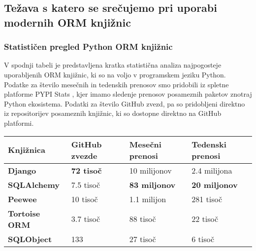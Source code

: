 \documentclass[a4paper,12pt,openright]{book}
\begin{document}
    \subsection{Težava s katero se srečujemo pri uporabi modernih ORM knjižnic}

    \subsubsection{Statističen pregled Python ORM knjižnic}

    V spodnji tabeli je predstavljena kratka statistična analiza najpogosteje uporabljenih ORM knjižnic, ki so na voljo v programskem jeziku Python. Podatke za število mesečnih in tedenskih prenosov smo pridobili iz spletne platforme PYPI Stats \cite{pypistats}, kjer imamo sledenje prenosov posameznih paketov znotraj Python ekosistema. Podatki za število GitHub zvezd, pa so pridobljeni direktno iz repositorijev posameznih knjižnic, ki so dostopne direktno na GitHub platformi.
    
    \noindent
    \begin{center}
        \begin{tabular}{p{}|p{}|p{}|p{}}
          {\bf Knjižnica} & {\bf GitHub zvezde} & {\bf Mesečni prenosi} & {\bf Tedenski prenosi} \\ \hline
          {\bf Django \cite{DJANGO_GITHUB}} & \textbf{\num{72} tisoč} & \num{10} milijonov & \num{2,4} milijona \\
          {\bf SQLAlchemy \cite{SQLALCHEMY_GITHUB}} & \num{7,5} tisoč &  \textbf{\num{83} miljonov} & \textbf{\num{20} miljonov} \\
          {\bf Peewee \cite{PEEWEE_GITHUB}} & \num{10} tisoč & \num{1,1} milijon & \num{281} tisoč \\
          {\bf Tortoise ORM \cite{TORTOISE_GITHUB}} & \num{3,7} tisoč & \num{88} tisoč & \num{22} tisoč \\
          {\bf SQLObject \cite{SQLOBJECT_GITHUB}} & 133 & \num{27} tisoč & \num{6} tisoč \\
        \end{tabular}
    \end{center}
\end{document}
